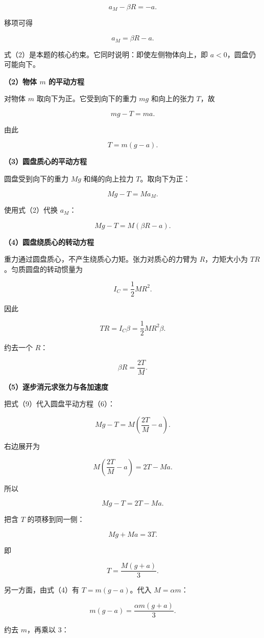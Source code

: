 \documentclass[12pt,a4paper,UTF8]{ctexart}
\begin{document}
\[
a_M-\beta R=-a.
\tag{1}
\]

移项可得

\[
\boxed{a_M=\beta R-a}.
\tag{2}
\]

式（2）是本题的核心约束。它同时说明：即使左侧物体向上，即
\(a<0\)，圆盘仍可能向下。

\textbf{（2）物体 \(m\) 的平动方程}

对物体 \(m\) 取向下为正。它受到向下的重力 \(mg\) 和向上的张力 \(T\)，故

\[
mg-T=ma.
\tag{3}
\]

由此

\[
T=m(g-a).
\tag{4}
\]

\textbf{（3）圆盘质心的平动方程}

圆盘受到向下的重力 \(Mg\) 和绳的向上拉力 \(T\)。取向下为正：

\[
Mg-T=Ma_M.
\tag{5}
\]

使用式（2）代换 \(a_M\)：

\[
Mg-T=M(\beta R-a).
\tag{6}
\]

\textbf{（4）圆盘绕质心的转动方程}

重力通过圆盘质心，不产生绕质心力矩。张力对质心的力臂为 \(R\)，力矩大小为
\(TR\)。匀质圆盘的转动惯量为

\[
I_C=\frac12MR^2.
\tag{7}
\]

因此

\[
TR=I_C\beta
=\frac12MR^2\beta.
\tag{8}
\]

约去一个 \(R\)：

\[
\boxed{\beta R=\frac{2T}{M}}.
\tag{9}
\]

\textbf{（5）逐步消元求张力与各加速度}

把式（9）代入圆盘平动方程（6）：

\[
Mg-T=M\left(\frac{2T}{M}-a\right).
\]

右边展开为

\[
M\left(\frac{2T}{M}-a\right)=2T-Ma.
\]

所以

\[
Mg-T=2T-Ma.
\]

把含 \(T\) 的项移到同一侧：

\[
Mg+Ma=3T.
\tag{10}
\]

即

\[
T=\frac{M(g+a)}3.
\tag{11}
\]

另一方面，由式（4）有 \(T=m(g-a)\)。代入 \(M=\alpha m\)：

\[
m(g-a)=\frac{\alpha m(g+a)}3.
\]

约去 \(m\)，再乘以 \(3\)：
\end{document}
